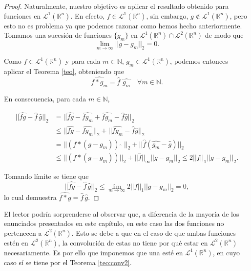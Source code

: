 \begin{proof}    
Naturalmente, nuestro objetivo es aplicar el resultado obtenido para funciones en $\mathscr{L}^1(\mathbb{R}^n)$. En efecto, $f \in \mathscr{L}^1(\mathbb{R}^n)$, sin embargo, $g \not\in \mathscr{L}^1(\mathbb{R}^n)$, pero esto no es problema ya que podemos razonar como hemos hecho anteriormente.
Tomamos una sucesión de funciones $\{g_m\}$ en $\mathscr{L}^1(\mathbb{R}^n) \cap \mathscr{L}^2(\mathbb{R}^n)$ de modo que 
\begin{equation}
  \lim_{m \rightarrow \infty}||g-g_m||_2 = 0.   
\end{equation}

\noindent Como $f \in \mathscr{L}^1(\mathbb{R}^n)$ y para cada $m \in \mathbb{N}$, $g_m \in \mathscr{L}^1(\mathbb{R}^n)$, podemos entonces aplicar el Teorema \ref{teo}, obteniendo que
\begin{equation}
\widehat{f*g_m} = \widehat{f} \, \,\widehat{g_m} \quad \forall m \in \mathbb{N}.
\end{equation}

\noindent En consecuencia, para cada $m \in \mathbb{N}$,

\begin{align}
||\widehat{fg}-\widehat{f}  \, \widehat{g}||_2 &= ||\widehat{fg}-\widehat{fg_m} + \widehat{fg_m}-\widehat{f} \widehat{g}||_2 \\
&\leq ||\widehat{fg}-\widehat{fg_m}||_2 + ||\widehat{fg_m}-\widehat{f} \widehat{g}||_2 \\
&= ||(f*(g-g_m))\,\,\widehat{}\,\,||_2 + ||\widehat{f}(\widehat{g_m}-\widehat{g})||_2 \\
&\leq||(f*(g-g_m))||_2 + ||\widehat{f}||_{\infty}||g-g_m||_2 
\leq
 2||f||_1||g-g_m||_2.
\end{align}

\noindent Tomando límite se tiene que
\begin{equation}
    ||\widehat{fg}-\widehat{f}  \, \widehat{g}||_2  \leq \lim_{m \rightarrow \infty}2||f||_1||g-g_m||_2  = 0,
\end{equation}
lo cual demuestra $\widehat{f*g} = \widehat{f} \,\widehat{g}$.
\end{proof}

\begin{observacion}
El lector podría sorprenderse al observar que, a diferencia de la mayoría de los enunciados presentados en este capítulo, en este caso las dos funciones no pertenecen a $\mathscr{L}^2(\mathbb{R}^n)$. Esto se debe a que en el caso de que ambas funciones estén en $\mathscr{L}^2(\mathbb{R}^n)$, la convolución de estas no tiene por qué estar en $\mathscr{L}^2(\mathbb{R}^n)$ necesariamente. Es por ello que imponemos que una esté  en $\mathscr{L}^1(\mathbb{R}^n)$, en cuyo caso sí se tiene por el Teorema \ref{teo:conv2}.
\end{observacion}


